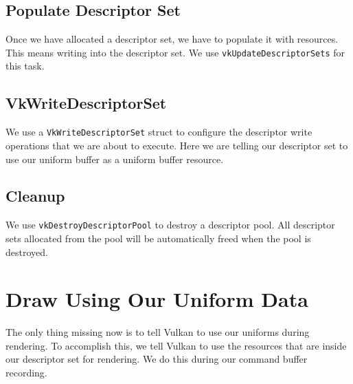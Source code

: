 \subsection{Populate Descriptor Set}

Once we have allocated a descriptor set, we have to populate it with resources.
This means writing into the descriptor set.
We use \texttt{vkUpdateDescriptorSets} for this task.

\begin{minipage}{\linewidth}{\noindent}
    
\end{minipage}

\subsection{VkWriteDescriptorSet}

We use a \texttt{VkWriteDescriptorSet} struct to configure the descriptor
write operations that we are about to execute.
Here we are telling our descriptor set to use our uniform buffer as a
uniform buffer resource.

\begin{minipage}{\linewidth}{\noindent}
    
\end{minipage}

\subsection{Cleanup}

We use \texttt{vkDestroyDescriptorPool} to destroy a descriptor pool.
All descriptor sets allocated from the pool will be automatically
freed when the pool is destroyed.

\section{Draw Using Our Uniform Data}

The only thing missing now is to tell Vulkan to use our uniforms during rendering.
To accomplish this, we tell Vulkan to use the resources that are inside
our descriptor set for rendering.
We do this during our command buffer recording.

\begin{minipage}{\linewidth}{\noindent}
    
\end{minipage}
